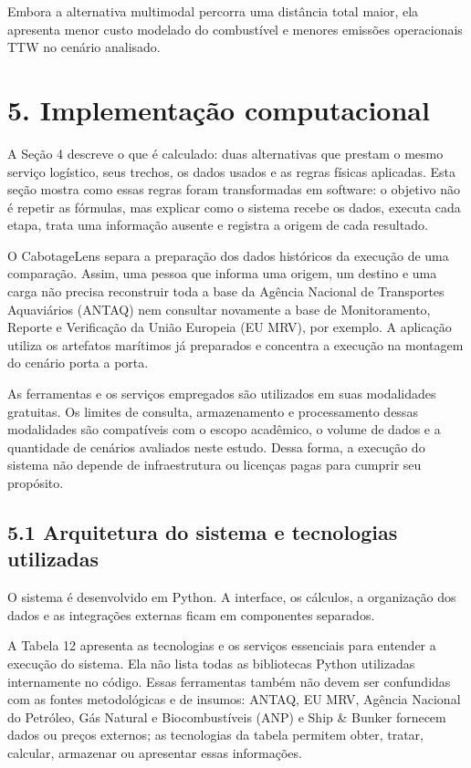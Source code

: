 \documentclass[brazil,]{article}
\let\oldsection\section
\renewcommand{\section}{\Needspace{14\baselineskip}\oldsection}
\let\oldsubsection\subsection
\renewcommand{\subsection}{\Needspace{12\baselineskip}\oldsubsection}
\begin{document}
Embora a alternativa multimodal percorra uma distância total maior, ela
apresenta menor custo modelado do combustível e menores emissões
operacionais TTW no cenário analisado.

\hypertarget{implementauxe7uxe3o-computacional}{%
\section{5. Implementação
computacional}\label{implementauxe7uxe3o-computacional}}

A Seção 4 descreve o que é calculado: duas alternativas que prestam o
mesmo serviço logístico, seus trechos, os dados usados e as regras
físicas aplicadas. Esta seção mostra como essas regras foram
transformadas em software: o objetivo não é repetir as fórmulas, mas
explicar como o sistema recebe os dados, executa cada etapa, trata uma
informação ausente e registra a origem de cada resultado.

O CabotageLens separa a preparação dos dados históricos da execução de
uma comparação. Assim, uma pessoa que informa uma origem, um destino e
uma carga não precisa reconstruir toda a base da Agência Nacional de
Transportes Aquaviários (ANTAQ) nem consultar novamente a base de
Monitoramento, Reporte e Verificação da União Europeia (EU MRV), por
exemplo. A aplicação utiliza os artefatos marítimos já preparados e
concentra a execução na montagem do cenário porta a porta.

As ferramentas e os serviços empregados são utilizados em suas
modalidades gratuitas. Os limites de consulta, armazenamento e
processamento dessas modalidades são compatíveis com o escopo acadêmico,
o volume de dados e a quantidade de cenários avaliados neste estudo.
Dessa forma, a execução do sistema não depende de infraestrutura ou
licenças pagas para cumprir seu propósito.

\hypertarget{arquitetura-do-sistema-e-tecnologias-utilizadas}{%
\subsection{5.1 Arquitetura do sistema e tecnologias
utilizadas}\label{arquitetura-do-sistema-e-tecnologias-utilizadas}}

O sistema é desenvolvido em Python. A interface, os cálculos, a
organização dos dados e as integrações externas ficam em componentes
separados.

A Tabela 12 apresenta as tecnologias e os serviços essenciais para
entender a execução do sistema. Ela não lista todas as bibliotecas
Python utilizadas internamente no código. Essas ferramentas também não
devem ser confundidas com as fontes metodológicas e de insumos: ANTAQ,
EU MRV, Agência Nacional do Petróleo, Gás Natural e Biocombustíveis
(ANP) e Ship \& Bunker fornecem dados ou preços externos; as tecnologias
da tabela permitem obter, tratar, calcular, armazenar ou apresentar
essas informações.
\end{document}
